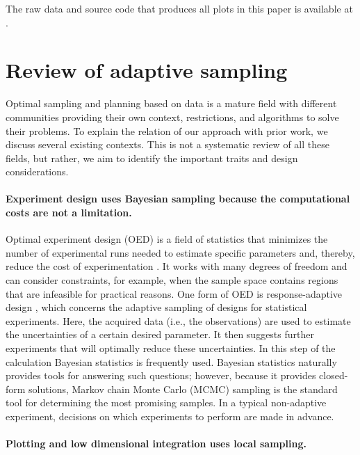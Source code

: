\documentclass[english, twocolumn, 10pt, aps, superscriptaddress, floatfix, prb, citeautoscript]{revtex4-1}
\renewcommand{\citep}{\cite}
\begin{document}
The raw data and source code that produces all plots in this paper is available at \citep{papercode}.

\hypertarget{sec:review}{%
\section{Review of adaptive sampling}\label{sec:review}}

Optimal sampling and planning based on data is a mature field with different communities providing their own context, restrictions, and algorithms to solve their problems.
To explain the relation of our approach with prior work, we discuss several existing contexts.
This is not a systematic review of all these fields, but rather, we aim to identify the important traits and design considerations.

\hypertarget{experiment-design-uses-bayesian-sampling-because-the-computational-costs-are-not-a-limitation.}{%
\paragraph{Experiment design uses Bayesian sampling because the computational costs are not a limitation.}\label{experiment-design-uses-bayesian-sampling-because-the-computational-costs-are-not-a-limitation.}}

Optimal experiment design (OED) is a field of statistics that minimizes the number of experimental runs needed to estimate specific parameters and, thereby, reduce the cost of experimentation \citep{Emery1998}.
It works with many degrees of freedom and can consider constraints, for example, when the sample space contains regions that are infeasible for practical reasons.
One form of OED is response-adaptive design \citep{Hu2006}, which concerns the adaptive sampling of designs for statistical experiments.
Here, the acquired data (i.e., the observations) are used to estimate the uncertainties of a certain desired parameter.
It then suggests further experiments that will optimally reduce these uncertainties.
In this step of the calculation Bayesian statistics is frequently used.
Bayesian statistics naturally provides tools for answering such questions; however, because it provides closed-form solutions, Markov chain Monte Carlo (MCMC) sampling is the standard tool for determining the most promising samples.
In a typical non-adaptive experiment, decisions on which experiments to perform are made in advance.

\hypertarget{plotting-and-low-dimensional-integration-uses-local-sampling.}{%
\paragraph{Plotting and low dimensional integration uses local sampling.}\label{plotting-and-low-dimensional-integration-uses-local-sampling.}}
\end{document}
